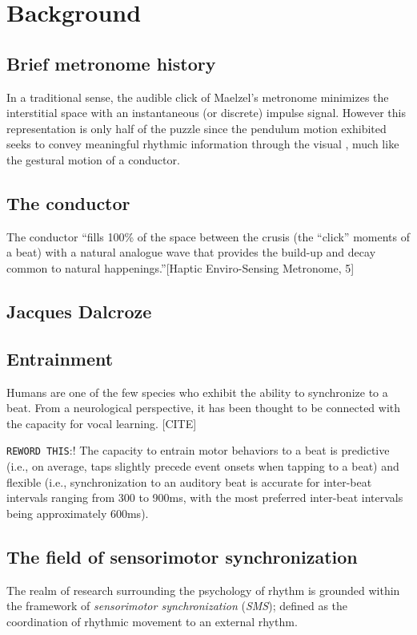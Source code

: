 \section{Background}
\subsection{Brief metronome history}

In a traditional sense, the audible click of Maelzel's metronome minimizes the interstitial space with an instantaneous (or discrete) impulse signal. However this representation is only half of the puzzle since the pendulum motion exhibited seeks to convey meaningful rhythmic information through the visual , much like the gestural motion of a conductor.

\subsection{The conductor}

The conductor ``fills 100\% of the space between the crusis (the “click” moments of a beat) with a natural analogue wave that provides the build-up and decay common to natural happenings.''[Haptic Enviro-Sensing Metronome, 5]

\subsection{Jacques Dalcroze}

\subsection{Entrainment}

Humans are one of the few species who exhibit the ability to synchronize to a beat. From a neurological perspective, it has been thought to be connected with the capacity for vocal learning. [CITE]

\verb!REWORD THIS!:!
The capacity to entrain motor behaviors to a beat is predictive (i.e., on average, taps slightly precede event onsets when tapping to a beat) and flexible (i.e., synchronization to an auditory beat is accurate for inter-beat intervals ranging from 300 to 900ms, with the most preferred inter-beat intervals being approximately 600ms).~\cite{repp2013sensorimotor}

\subsection{The field of sensorimotor synchronization}
The realm of research surrounding the psychology of rhythm is grounded within the framework of \textit{sensorimotor synchronization} (\textit{SMS}); defined as the coordination of rhythmic movement to an external rhythm. 


